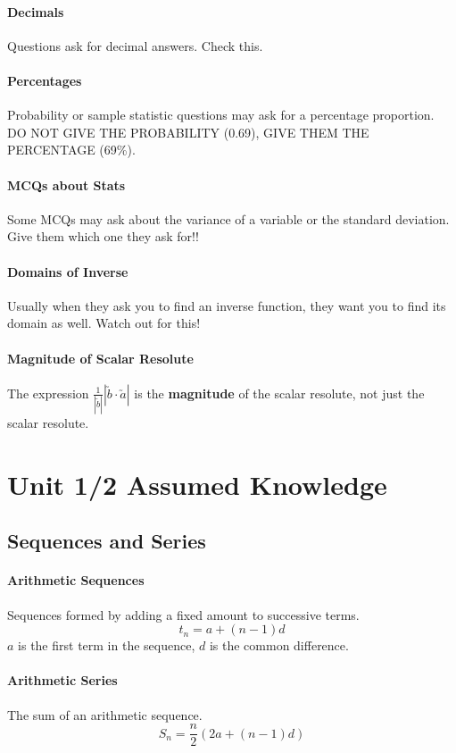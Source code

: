 \documentclass[a4paper,twoside,10pt]{article}
\begin{document}
		\paragraph{Decimals} Questions ask for decimal answers. Check this.
		\paragraph{Percentages} Probability or sample statistic questions may ask for a percentage proportion. DO NOT GIVE THE PROBABILITY (0.69), GIVE THEM THE PERCENTAGE (69\%).
		\paragraph{MCQs about Stats} Some MCQs may ask about the variance of a variable or the standard deviation. Give them which one they ask for!!
		\paragraph{Domains of Inverse} Usually when they ask you to find an inverse function, they want you to find its domain as well. Watch out for this!
		\paragraph{Magnitude of Scalar Resolute} The expression $\displaystyle \frac{1}{|\utilde{b}|}|\utilde{b}\cdot\utilde{a}|$ is the \textbf{magnitude} of the scalar resolute, not just the scalar resolute.
	\section{Unit 1/2 Assumed Knowledge}
		\subsection{Sequences and Series}
			\paragraph{Arithmetic Sequences} Sequences formed by adding a fixed amount to successive terms.
			\[
				t_n=a+(n-1)d
			\]
			$a$ is the first term in the sequence, $d$ is the common difference.
			
			\paragraph{Arithmetic Series} The sum of an arithmetic sequence.
			\[
				S_n=\frac{n}{2}\left(2a+(n-1)d\right)
			\]
			
\end{document}
